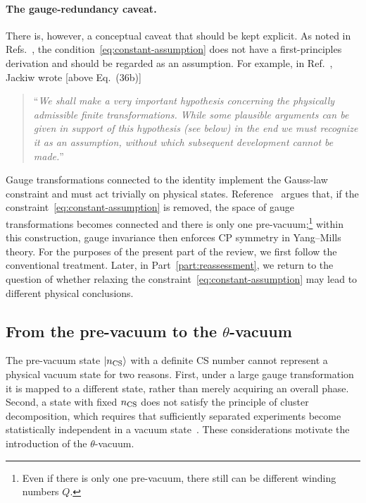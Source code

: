 \documentclass[review]{elsarticle}
\numberwithin{equation}{section}
\numberwithin{table}{section}
\numberwithin{figure}{section}
\begin{document}
\paragraph{The gauge-redundancy caveat.}
There is, however, a conceptual caveat that should be kept explicit. As noted in Refs.~\cite{Jackiw:1979ur,itzykson2006quantum}, the condition~\eqref{eq:constant-assumption} does not have a first-principles derivation and should be regarded as an assumption. For example, in Ref.~\cite{Jackiw:1979ur}, Jackiw wrote [above Eq.~(36b)]
\begin{quote}
``{\it We shall make a very important hypothesis concerning the physically admissible finite transformations. While some plausible arguments can be given in support of this hypothesis (see below) in the end we must recognize it as an assumption, without which subsequent development cannot be made.}''
\end{quote}
Gauge transformations connected to the identity implement the Gauss-law constraint and must act trivially on physical states. Reference~\cite{Ai:2024vfa} argues that, if the constraint~\eqref{eq:constant-assumption} is removed, the space of gauge transformations becomes connected and there is only one pre-vacuum;\footnote{Even if there is only one pre-vacuum, there still can be different winding numbers $Q$.} within this construction, gauge invariance then enforces CP symmetry in Yang--Mills theory. For the purposes of the present part of the review, we first follow the conventional treatment. Later, in Part~\ref{part:reassessment}, we return to the question of whether relaxing the constraint~\eqref{eq:constant-assumption} may lead to different physical conclusions.



\subsection{From the pre-vacuum to the \texorpdfstring{$\theta$}{theta}-vacuum}

The pre-vacuum state $|n_{\rm CS}\rangle$ with a definite CS number cannot represent a physical vacuum state for two reasons. First, under a large gauge transformation it is mapped to a different state, rather than merely acquiring an overall phase. Second, a state with fixed $n_{\rm CS}$ does not satisfy the principle of cluster decomposition, which requires that sufficiently separated experiments become statistically independent in a vacuum state~\cite{streater2000pct,Weinberg:1995mt}. These considerations motivate the introduction of the $\theta$-vacuum.
\end{document}
